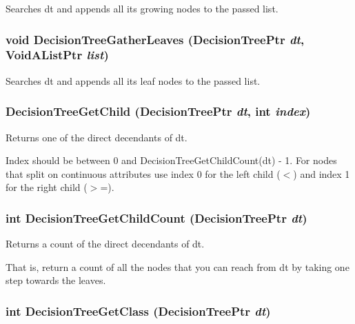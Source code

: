 Searches dt and appends all its growing nodes to the passed list. 

\subsubsection{\setlength{\rightskip}{0pt plus 5cm}void Decision\-Tree\-Gather\-Leaves ({\bf Decision\-Tree\-Ptr} {\em dt}, Void\-AList\-Ptr {\em list})}\label{DecisionTree_8h_a28}


Searches dt and appends all its leaf nodes to the passed list. 

\subsubsection{ Decision\-Tree\-Get\-Child ({\bf Decision\-Tree\-Ptr} {\em dt}, int {\em index})}\label{DecisionTree_8h_a24}


Returns one of the direct decendants of dt. 

Index should be between 0 and Decision\-Tree\-Get\-Child\-Count(dt) - 1. For nodes that split on continuous attributes use index 0 for the left child ($<$) and index 1 for the right child ($>$=). 
\subsubsection{\setlength{\rightskip}{0pt plus 5cm}int Decision\-Tree\-Get\-Child\-Count ({\bf Decision\-Tree\-Ptr} {\em dt})}\label{DecisionTree_8h_a23}


Returns a count of the direct decendants of dt. 

That is, return a count of all the nodes that you can reach from dt by taking one step towards the leaves. 
\subsubsection{\setlength{\rightskip}{0pt plus 5cm}int Decision\-Tree\-Get\-Class ({\bf Decision\-Tree\-Ptr} {\em dt})}\label{DecisionTree_8h_a12}


